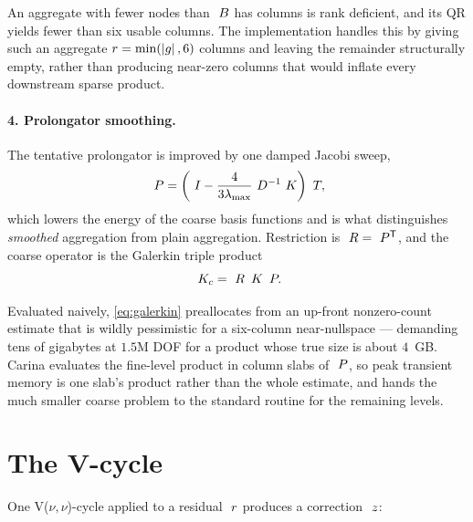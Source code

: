 \begin{remark}
An aggregate with fewer nodes than $~B$ has columns is rank deficient, and
its QR yields fewer than six usable columns.  The implementation handles this
by giving such an aggregate $r = \min(\left\lvert g \right\rvert, 6)$ columns and leaving the
remainder structurally empty, rather than producing near-zero columns that
would inflate every downstream sparse product.
\end{remark}

\paragraph{4. Prolongator smoothing.}  The tentative prolongator is improved by
one damped Jacobi sweep,
\begin{equation}
  ~P = \left(~I - \frac{4}{3\lambda_{\max}}~D^{-1}~K\right)~T,
\end{equation}
which lowers the energy of the coarse basis functions and is what distinguishes
\emph{smoothed} aggregation from plain aggregation.  Restriction is
$~R = ~P^{\mathsf{T}}$, and the coarse operator is the Galerkin triple
product
\begin{equation}
  ~K_c = ~R\, ~K\, ~P .
  \label{eq:galerkin}
\end{equation}

\begin{remark}[Memory]
Evaluated naively, \eqref{eq:galerkin} preallocates from an up-front
nonzero-count estimate that is wildly pessimistic for a six-column
near-nullspace --- demanding tens of gigabytes at $1.5$M DOF for a product
whose true size is about $4$~GB.  Carina evaluates the fine-level product in
column slabs of $~P$, so peak transient memory is one slab's product rather
than the whole estimate, and hands the much smaller coarse problem to the
standard routine for the remaining levels.
\end{remark}

\section{The V-cycle}

One V($\nu,\nu$)-cycle applied to a residual $~r$ produces a correction
$~z$:

